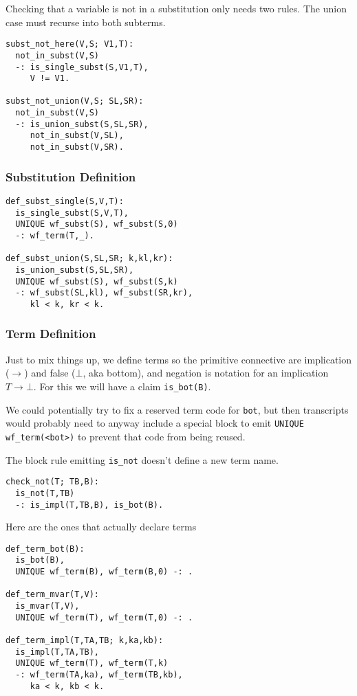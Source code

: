 \documentclass{article}
\theoremstyle{plain}
\theoremstyle{definition}
\begin{document}
Checking that a variable is not in a substitution only needs
two rules. The union case must recurse into both subterms.

\begin{verbatim}
subst_not_here(V,S; V1,T):
  not_in_subst(V,S)
  -: is_single_subst(S,V1,T),
     V != V1.

subst_not_union(V,S; SL,SR):
  not_in_subst(V,S)
  -: is_union_subst(S,SL,SR),
     not_in_subst(V,SL),
     not_in_subst(V,SR).
\end{verbatim}

\subsubsection{Substitution Definition}\label{substitution-definition}

\begin{verbatim}
def_subst_single(S,V,T):
  is_single_subst(S,V,T),
  UNIQUE wf_subst(S), wf_subst(S,0)
  -: wf_term(T,_).

def_subst_union(S,SL,SR; k,kl,kr):
  is_union_subst(S,SL,SR),
  UNIQUE wf_subst(S), wf_subst(S,k)
  -: wf_subst(SL,kl), wf_subst(SR,kr),
     kl < k, kr < k.
\end{verbatim}

\subsubsection{Term Definition}\label{sec:prop-example-term-definition}

Just to mix things up, we define terms so the primitive connective are
implication ($\rightarrow$) and false ($\bot$, aka bottom), and negation is notation for an
implication \(T\rightarrow\bot\).
For this we will have a claim \texttt{is\_bot(B)}.

We could potentially try to fix a reserved term code for \texttt{bot},
but then transcripts would probably need to anyway include a special
block to emit \texttt{UNIQUE wf\_term(\textless{}bot\textgreater{})}
to prevent that code from being reused.

The block rule emitting \texttt{is\_not} doesn't define a new term name.

\begin{verbatim}
check_not(T; TB,B):
  is_not(T,TB)
  -: is_impl(T,TB,B), is_bot(B).
\end{verbatim}

Here are the ones that actually declare terms

\begin{verbatim}
def_term_bot(B):
  is_bot(B),
  UNIQUE wf_term(B), wf_term(B,0) -: .

def_term_mvar(T,V):
  is_mvar(T,V),
  UNIQUE wf_term(T), wf_term(T,0) -: .

def_term_impl(T,TA,TB; k,ka,kb):
  is_impl(T,TA,TB),
  UNIQUE wf_term(T), wf_term(T,k)
  -: wf_term(TA,ka), wf_term(TB,kb),
     ka < k, kb < k.
\end{verbatim}
\end{document}
